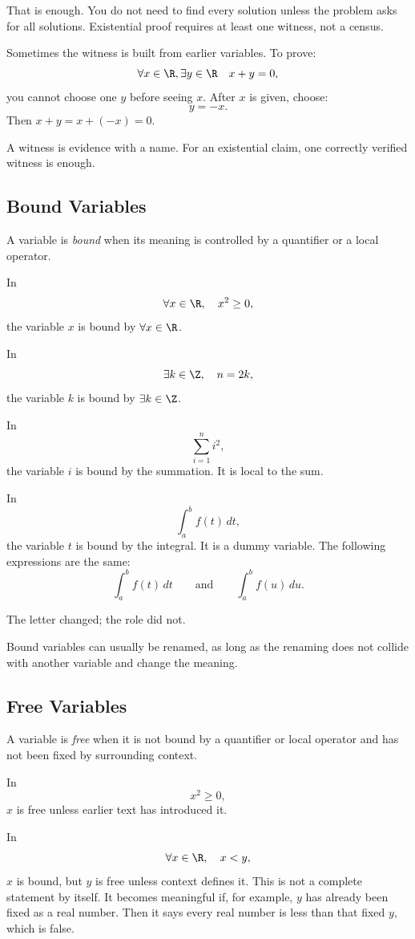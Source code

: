 That is enough. You do not need to find every solution unless the problem asks for all solutions. Existential proof requires at least one witness, not a census.

Sometimes the witness is built from earlier variables. To prove:
\[
\forall x\in\R,\exists y\in\R\quad x+y=0,
\]
you cannot choose one $y$ before seeing $x$. After $x$ is given, choose:
\[
y=-x.
\]
Then $x+y=x+(-x)=0$.

\begin{intuitionbox}
A witness is evidence with a name. For an existential claim, one correctly verified witness is enough.
\end{intuitionbox}

\subsection{Bound Variables}

A variable is \emph{bound} when its meaning is controlled by a quantifier or a local operator.

In
\[
\forall x\in\R,\quad x^2\geq0,
\]
the variable $x$ is bound by $\forall x\in\R$.

In
\[
\exists k\in\Z,\quad n=2k,
\]
the variable $k$ is bound by $\exists k\in\Z$.

In
\[
\sum_{i=1}^{n} i^2,
\]
the variable $i$ is bound by the summation. It is local to the sum.

In
\[
\int_a^b f(t)\,dt,
\]
the variable $t$ is bound by the integral. It is a dummy variable. The following expressions are the same:
\[
\int_a^b f(t)\,dt
\qquad\text{and}\qquad
\int_a^b f(u)\,du.
\]

The letter changed; the role did not.

\begin{formalbox}
Bound variables can usually be renamed, as long as the renaming does not collide with another variable and change the meaning.
\end{formalbox}

\subsection{Free Variables}

A variable is \emph{free} when it is not bound by a quantifier or local operator and has not been fixed by surrounding context.

In
\[
x^2\geq0,
\]
$x$ is free unless earlier text has introduced it.

In
\[
\forall x\in\R,\quad x<y,
\]
$x$ is bound, but $y$ is free unless context defines it. This is not a complete statement by itself. It becomes meaningful if, for example, $y$ has already been fixed as a real number. Then it says every real number is less than that fixed $y$, which is false.

